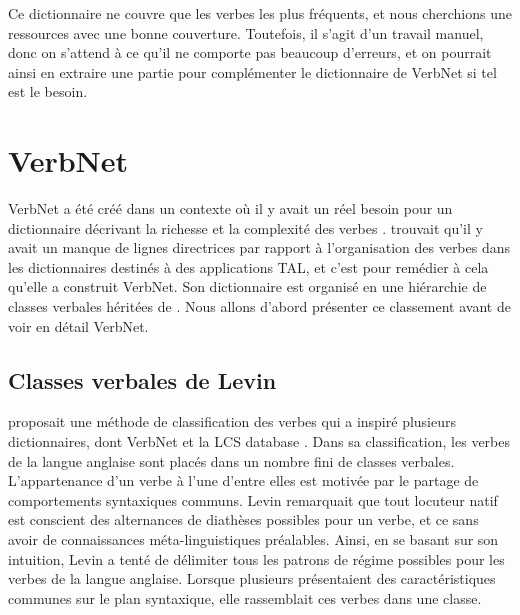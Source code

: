 Ce dictionnaire ne couvre que les verbes les plus fréquents, et nous cherchions une ressources avec une bonne couverture. Toutefois, il s'agit d'un travail manuel, donc on s'attend à ce qu'il ne comporte pas beaucoup d'erreurs, et on pourrait ainsi en extraire une partie pour complémenter le dictionnaire de VerbNet si tel est le besoin.


\section{VerbNet}

VerbNet a été créé dans un contexte où il y avait un réel besoin pour un dictionnaire décrivant la richesse et la complexité des verbes \citep{KipperClassBasedConstructionVerb2000}. \cite{SchulerVerbnetBroadcoverageComprehensive2005} trouvait qu'il y avait un manque de lignes directrices par rapport à l'organisation des verbes dans les dictionnaires destinés à des applications \ac{TAL}, et c'est pour remédier à cela qu'elle a construit VerbNet. Son dictionnaire est organisé en une hiérarchie de classes verbales héritées de \cite{verb-classes.levin.1993}. Nous allons d'abord présenter ce classement avant de voir en détail VerbNet.

\subsection{Classes verbales de Levin}

\cite{verb-classes.levin.1993} proposait une méthode de classification des verbes qui a inspiré plusieurs dictionnaires, dont VerbNet \citep{SchulerVerbnetBroadcoverageComprehensive2005} et la LCS database \citep{AyanGeneratingParsingLexicon2002a,DorrUseLexicalSemantics1992}. Dans sa classification, les verbes de la langue anglaise sont placés dans un nombre fini de classes verbales. L'appartenance d'un verbe à l'une d'entre elles est motivée par le partage de comportements syntaxiques communs. Levin remarquait que tout locuteur natif est conscient des alternances de diathèses possibles pour un verbe, et ce sans avoir de connaissances méta-linguistiques préalables. Ainsi, en se basant sur son intuition, Levin a tenté de délimiter tous les patrons de régime possibles pour les verbes de la langue anglaise. Lorsque plusieurs présentaient des caractéristiques communes sur le plan syntaxique, elle rassemblait ces verbes dans une classe.

